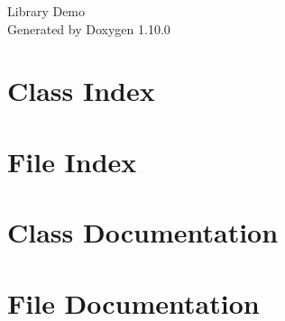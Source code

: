 \documentclass[twoside]{book}
\newcommand{\+}{\discretionary{\mbox{\scriptsize$\hookleftarrow$}}{}{}}
\newcommand{\clearemptydoublepage}{%
    \newpage{\pagestyle{empty}\cleardoublepage}%
  }
\begin{document}
  \raggedbottom
    \hypersetup{pageanchor=false,
                bookmarksnumbered=true,
                pdfencoding=unicode
               }
  \begin{titlepage}
  \vspace*{7cm}
  \begin{center}%
  {\Large Library Demo}\\
  \vspace*{1cm}
  {\large Generated by Doxygen 1.10.0}\\
  \end{center}
  \end{titlepage}
  \clearemptydoublepage
  \tableofcontents
  \clearemptydoublepage
  \hypersetup{pageanchor=true}
\chapter{Class Index}

\chapter{File Index}

\chapter{Class Documentation}




\chapter{File Documentation}




  \backmatter
  \newpage
  \clearemptydoublepage
  \printindex
\end{document}
